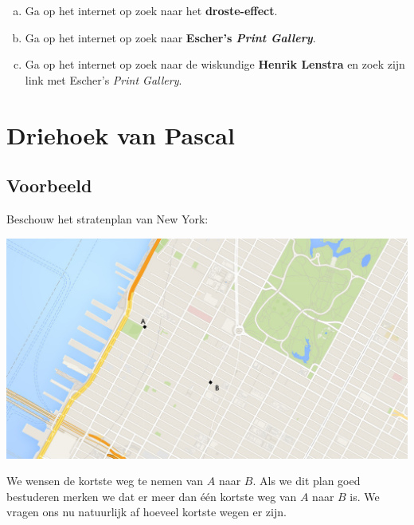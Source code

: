 \documentclass[12pt,a4paper,twoside]{article}
\begin{document}
\begin{oefening}
\begin{enumerate}[(a)]
\item Ga op het internet op zoek naar het {\bf droste-effect}.
\item Ga op het internet op zoek naar {\bf Escher's {\em Print Gallery}}.
\item Ga op het internet op zoek naar de wiskundige {\bf Henrik Lenstra} en zoek zijn link met Escher's {\em Print Gallery}.
\end{enumerate}
\end{oefening}

\cleardoublepage
\section{Driehoek van Pascal}

\subsection{Voorbeeld}

Beschouw het stratenplan van New York:
\begin{center}
\includegraphics[width=1\textwidth]{NY_grid}
\end{center}

We wensen de kortste weg te nemen van $A$ naar $B$. Als we dit plan goed bestuderen merken we dat er meer dan één kortste weg van $A$ naar $B$ is. We vragen ons nu natuurlijk af hoeveel kortste wegen er zijn.
\end{document}
